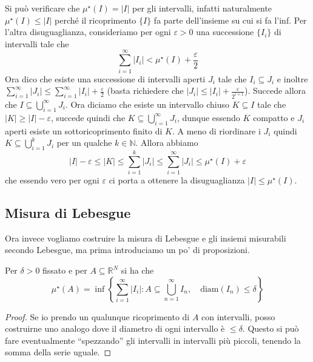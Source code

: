 Si può verificare che \(\mu^\star(I) = |I|\) per gli intervalli, infatti
naturalmente \(\mu^\star(I) \le |I|\) perché il ricoprimento \(\{I\} \) fa parte
dell'insieme su cui si fa l'inf. Per l'altra disuguaglianza, consideriamo per
ogni \(\varepsilon>0\) una successione \(\{I_{i}\} \) di intervalli tale che 
\[
    \sum_{i=1}^{\infty} |I_{i}| < \mu^\star(I) + \frac{\varepsilon}{2}
\]
Ora dico che esiste una successione di intervalli aperti \(J_{i}\) tale che
\(I_{i} \subseteq J_{i} \) e inoltre \(\sum_{i=1}^{\infty} |J_{i}| \le
\sum_{i=1}^{\infty} |I_{i}| + \frac{\varepsilon}{2} \) (basta richiedere che
\(|J_{i}| \le |I_{i}| + \frac{\varepsilon}{2^{i+1}}\)). Succede allora che \(I
\subseteq \bigcup_{i=1}^{\infty}J_{i}  \). Ora diciamo che esiste un intervallo
chiuso \(K \subseteq I \) tale che \(|K| \ge |I| - \varepsilon\), succede quindi
che \(K \subseteq \bigcup_{i = 1}^{\infty}J_{i}\), dunque essendo \(K\) compatto
e \(J_{i}\) aperti esiste un sottoricoprimento finito di \(K\). A meno di
riordinare i \(J_{i}\) quindi \(K \subseteq \bigcup_{i = 1}^{k} J_{i}  \) per un
qualche \(k \in \mathbb{N}\). Allora abbiamo
\[
    |I| - \varepsilon \le  |K| \le \sum_{i=1}^{k} |J_{i}| \le
    \sum_{i=1}^{\infty} |J_{i}| \le \mu^\star(I) + \varepsilon
\]
che essendo vero per ogni \(\varepsilon\) ci porta a ottenere la disuguaglianza
\(|I| \le \mu^\star(I)\).

\subsection{Misura di Lebesgue}
Ora invece vogliamo costruire la misura di Lebesgue e gli
insiemi misurabili secondo Lebesgue, ma prima introduciamo un po' di
proposizioni.
\begin{proposition}\label{prop:prop_1}
    Per \(\delta > 0\) fissato e per \(A \subseteq \mathbb{R}^{N} \) si ha che 
    \[
        \mu^\star(A) = \inf\left\{ \sum_{i=1}^{\infty} |I_{i}| : A \subseteq
            \bigcup_{n = 1}^{\infty} I_{n}, \quad \text{diam}(I_{n}) \le \delta
        \right\}
    \]
\end{proposition}
\begin{proof}
    Se io prendo un qualunque ricoprimento di \(A\) con intervalli, posso
    costruirne uno analogo dove il diametro di ogni intervallo è \(\le \delta\).
    Questo si può fare eventualmente ``spezzando'' gli intervalli in intervalli
    più piccoli, tenendo la somma della serie uguale.
\end{proof}

